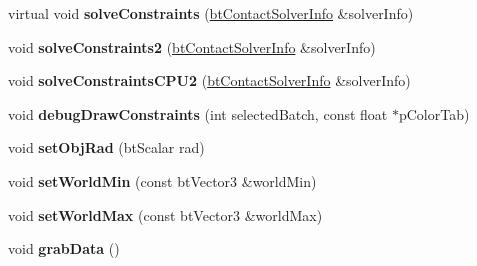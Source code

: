 \begin{DoxyCompactItemize}
\item 
\hypertarget{classbt_gpu_demo_dynamics_world_a31d0eedc64cc010c3c8d6ade35c4a26c}{virtual void {\bfseries solve\+Constraints} (\hyperlink{structbt_contact_solver_info}{bt\+Contact\+Solver\+Info} \&solver\+Info)}\label{classbt_gpu_demo_dynamics_world_a31d0eedc64cc010c3c8d6ade35c4a26c}

\item 
\hypertarget{classbt_gpu_demo_dynamics_world_ae77c47c967b235f66d529f5d61f38a67}{void {\bfseries solve\+Constraints2} (\hyperlink{structbt_contact_solver_info}{bt\+Contact\+Solver\+Info} \&solver\+Info)}\label{classbt_gpu_demo_dynamics_world_ae77c47c967b235f66d529f5d61f38a67}

\item 
\hypertarget{classbt_gpu_demo_dynamics_world_a3fd54238d863ae6ce5bc39094ea20fe0}{void {\bfseries solve\+Constraints\+C\+P\+U2} (\hyperlink{structbt_contact_solver_info}{bt\+Contact\+Solver\+Info} \&solver\+Info)}\label{classbt_gpu_demo_dynamics_world_a3fd54238d863ae6ce5bc39094ea20fe0}

\item 
\hypertarget{classbt_gpu_demo_dynamics_world_af1612ad8622b7dedb890f2ee353097fc}{void {\bfseries debug\+Draw\+Constraints} (int selected\+Batch, const float $\ast$p\+Color\+Tab)}\label{classbt_gpu_demo_dynamics_world_af1612ad8622b7dedb890f2ee353097fc}

\item 
\hypertarget{classbt_gpu_demo_dynamics_world_ae35848e8eb4e158110237dec9a30df4c}{void {\bfseries set\+Obj\+Rad} (bt\+Scalar rad)}\label{classbt_gpu_demo_dynamics_world_ae35848e8eb4e158110237dec9a30df4c}

\item 
\hypertarget{classbt_gpu_demo_dynamics_world_a43d31d078b18796593147801618b1c00}{void {\bfseries set\+World\+Min} (const bt\+Vector3 \&world\+Min)}\label{classbt_gpu_demo_dynamics_world_a43d31d078b18796593147801618b1c00}

\item 
\hypertarget{classbt_gpu_demo_dynamics_world_a11ff01b25a0539798e58f7dd887702dc}{void {\bfseries set\+World\+Max} (const bt\+Vector3 \&world\+Max)}\label{classbt_gpu_demo_dynamics_world_a11ff01b25a0539798e58f7dd887702dc}

\item 
\hypertarget{classbt_gpu_demo_dynamics_world_a009c23e910df7ad52de1d08e8553df9f}{void {\bfseries grab\+Data} ()}\label{classbt_gpu_demo_dynamics_world_a009c23e910df7ad52de1d08e8553df9f}


\end{DoxyCompactItemize}
